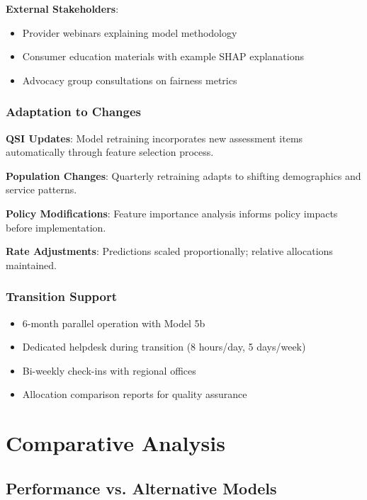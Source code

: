 \textbf{External Stakeholders}:
\begin{itemize}
    \item Provider webinars explaining model methodology
    \item Consumer education materials with example SHAP explanations
    \item Advocacy group consultations on fairness metrics
\end{itemize}

\subsubsection{Adaptation to Changes}

\textbf{QSI Updates}: Model retraining incorporates new assessment items automatically through feature selection process.

\textbf{Population Changes}: Quarterly retraining adapts to shifting demographics and service patterns.

\textbf{Policy Modifications}: Feature importance analysis informs policy impacts before implementation.

\textbf{Rate Adjustments}: Predictions scaled proportionally; relative allocations maintained.

\subsubsection{Transition Support}

\begin{itemize}
    \item 6-month parallel operation with Model 5b
    \item Dedicated helpdesk during transition (8 hours/day, 5 days/week)
    \item Bi-weekly check-ins with regional offices
    \item Allocation comparison reports for quality assurance
\end{itemize}

\section{Comparative Analysis}

\subsection{Performance vs. Alternative Models}

